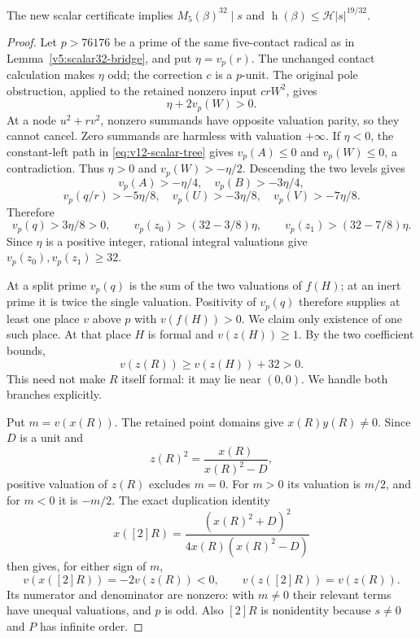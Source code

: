 \begin{lemma}\label{lem:v12-scalar-sound}
The new scalar certificate implies
$M_5(\beta)^{32}\mid s$ and
$\operatorname h(\beta)\le\mathcal H|s|^{19/32}$.
\end{lemma}
\begin{proof}
Let $p>76176$ be a prime of the same five-contact radical as in
Lemma~\ref{v5:scalar32-bridge}, and put $\eta=v_p(r)$.
The unchanged contact calculation makes $\eta$ odd; the correction
$c$ is a $p$-unit.  The original pole obstruction, applied to the
retained nonzero input $crW^2$, gives
\[
 \eta+2v_p(W)>0.
\]
At a node $u^2+rv^2$, nonzero summands have opposite valuation parity,
so they cannot cancel.  Zero summands are harmless with valuation
$+\infty$.  If $\eta<0$, the constant-left path in
\eqref{eq:v12-scalar-tree} gives $v_p(A)\le0$ and $v_p(W)\le0$, a
contradiction.  Thus $\eta>0$ and $v_p(W)>-\eta/2$.
Descending the two levels gives
\[
 v_p(A)>-\eta/4,\quad v_p(B)>-3\eta/4,
\]
\[
 v_p(q/r)>-5\eta/8,\quad
 v_p(U)>-3\eta/8,\quad v_p(V)>-7\eta/8.
\]
Therefore
\begin{equation}\label{eq:v12-scalar-valuations}
 v_p(q)>3\eta/8>0,\qquad
 v_p(z_0)>(32-3/8)\eta,\qquad
 v_p(z_1)>(32-7/8)\eta.
\end{equation}
Since $\eta$ is a positive integer, rational integral valuations give
$v_p(z_0),v_p(z_1)\ge32$.

At a split prime $v_p(q)$ is the sum of the two valuations of $f(H)$;
at an inert prime it is twice the single valuation.  Positivity of
$v_p(q)$ therefore supplies at least one place $v$ above $p$ with
$v(f(H))>0$.  We claim only existence of one such place.  At that
place $H$ is formal and $v(z(H))\ge1$.  By the two coefficient bounds,
\[
 v(z(R))\ge v(z(H))+32>0.
\]
This need not make $R$ itself formal: it may lie near $(0,0)$.
We handle both branches explicitly.

Put $m=v(x(R))$.  The retained point domains give $x(R)y(R)\ne0$.
Since $D$ is a unit and
\[
 z(R)^2=\frac{x(R)}{x(R)^2-D},
\]
positive valuation of $z(R)$ excludes $m=0$.  For $m>0$ its valuation
is $m/2$, and for $m<0$ it is $-m/2$.  The exact duplication identity
\begin{equation}\label{eq:v12-duplication}
 x([2]R)=\frac{(x(R)^2+D)^2}{4x(R)(x(R)^2-D)}
\end{equation}
then gives, for either sign of $m$,
\[
 v(x([2]R))=-2v(z(R))<0,\qquad v(z([2]R))=v(z(R)).
\]
Its numerator and denominator are nonzero: with $m\ne0$ their
relevant terms have unequal valuations, and $p$ is odd.
Also $[2]R$ is nonidentity because $s\ne0$ and $P$ has infinite order.


\end{proof}
